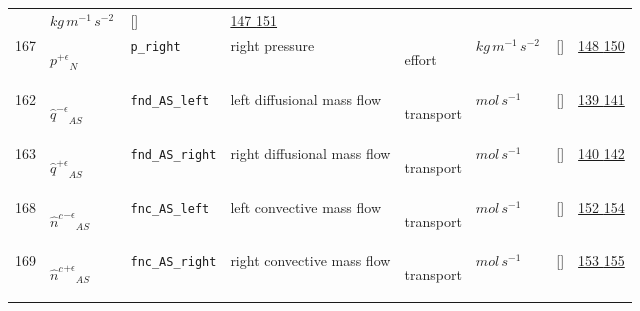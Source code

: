 \begin{longtable}{|p{1cm}|p{3cm}|p{3cm}|p{7cm}|p{3.0cm}|p{3cm}|p{2cm}|p{1cm}|}
             & $ kg \,m^{-1} \,s^{-2} \, $
             & []
             & \hyperlink{"e:147"}{ 147 }
                 \hyperlink{"e:151"}{ 151 }
                 \\
    167
             & \hypertarget{"v:167"}{ $ {p^{+\epsilon}}_{N} $}
             & \verb|p_right|
             & right pressure
             & \begin{lay}effort \end{lay}
             & $ kg \,m^{-1} \,s^{-2} \, $
             & []
             & \hyperlink{"e:148"}{ 148 }
                 \hyperlink{"e:150"}{ 150 }
                 \\
    162
             & \hypertarget{"v:162"}{ $ {\hat{q}^{-\epsilon}}_{{A S}} $}
             & \verb|fnd_AS_left|
             & left diffusional mass flow
             & \begin{lay}transport \end{lay}
             & $ mol \,s^{-1} \, $
             & []
             & \hyperlink{"e:139"}{ 139 }
                 \hyperlink{"e:141"}{ 141 }
                 \\
    163
             & \hypertarget{"v:163"}{ $ {\hat{q}^{+\epsilon}}_{{A S}} $}
             & \verb|fnd_AS_right|
             & right diffusional mass flow
             & \begin{lay}transport \end{lay}
             & $ mol \,s^{-1} \, $
             & []
             & \hyperlink{"e:140"}{ 140 }
                 \hyperlink{"e:142"}{ 142 }
                 \\
    168
             & \hypertarget{"v:168"}{ $ {{\hat{n}^{c}}^{-\epsilon}}_{{A S}} $}
             & \verb|fnc_AS_left|
             & left convective mass flow
             & \begin{lay}transport \end{lay}
             & $ mol \,s^{-1} \, $
             & []
             & \hyperlink{"e:152"}{ 152 }
                 \hyperlink{"e:154"}{ 154 }
                 \\
    169
             & \hypertarget{"v:169"}{ $ {{\hat{n}^{c}}^{+\epsilon}}_{{A S}} $}
             & \verb|fnc_AS_right|
             & right convective mass flow
             & \begin{lay}transport \end{lay}
             & $ mol \,s^{-1} \, $
             & []
             & \hyperlink{"e:153"}{ 153 }
                 \hyperlink{"e:155"}{ 155 }
                 \\
    \end{longtable}